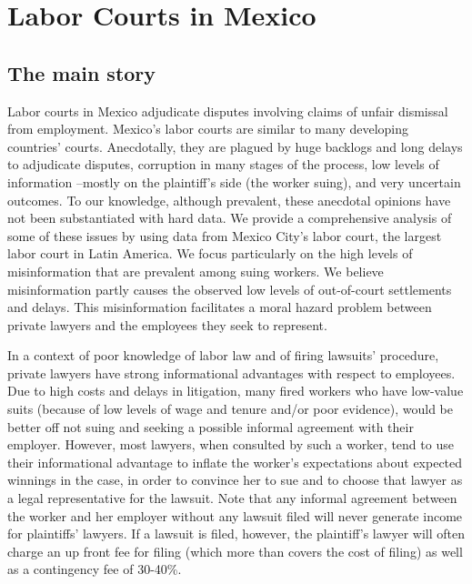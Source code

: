 \documentclass[11pt]{article}
\begin{document}
\section{Labor Courts in Mexico}\label{ContextSection}


\subsection{The main story}

Labor courts in Mexico adjudicate disputes involving claims of unfair dismissal from employment. Mexico's labor courts are  similar to many developing countries' courts. Anecdotally, they are plagued by huge backlogs and long delays to adjudicate disputes, corruption in many stages of the process, low levels of information --mostly on the plaintiff's side (the worker suing), and very uncertain outcomes. To our knowledge, although prevalent, these anecdotal opinions have not been substantiated with hard data. We provide a comprehensive analysis of some of these issues by using data from Mexico City’s labor court, the largest labor court in Latin America. We focus particularly on the high levels of misinformation that are prevalent among suing workers. We believe misinformation partly causes the observed low levels of out-of-court settlements and delays. This misinformation facilitates a moral hazard problem between private lawyers and the employees they seek to represent. 

In a context of poor knowledge of labor law and of firing lawsuits' procedure, private lawyers have strong informational advantages with respect to employees. Due to high costs and delays in litigation, many fired workers who have low-value suits (because of low levels of wage and tenure and/or poor evidence), would be better off not suing and seeking a possible informal agreement with their employer. However, most lawyers, when consulted by such a worker, tend to use their informational advantage to inflate the worker's expectations about expected winnings in the case, in order to convince her to sue and to choose that lawyer as a legal representative for the lawsuit. Note that any informal agreement between the worker and her employer without any lawsuit filed will never generate income for plaintiffs' lawyers. If a lawsuit is filed, however, the plaintiff's lawyer will often charge an up front fee for filing (which more than covers the cost of filing) as well as a contingency fee of 30-40\%. 
\end{document}
